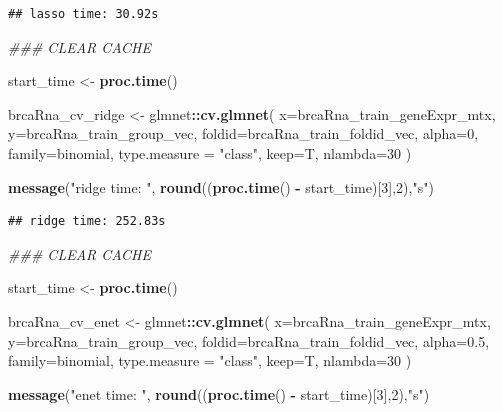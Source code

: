 \documentclass[
]{book}
\newenvironment{Shaded}{\begin{snugshade}}{\end{snugshade}}
\newcommand{\CommentTok}[1]{\textcolor[rgb]{0.56,0.35,0.01}{\textit{#1}}}
\newcommand{\DataTypeTok}[1]{\textcolor[rgb]{0.13,0.29,0.53}{#1}}
\newcommand{\DecValTok}[1]{\textcolor[rgb]{0.00,0.00,0.81}{#1}}
\newcommand{\FloatTok}[1]{\textcolor[rgb]{0.00,0.00,0.81}{#1}}
\newcommand{\KeywordTok}[1]{\textcolor[rgb]{0.13,0.29,0.53}{\textbf{#1}}}
\newcommand{\NormalTok}[1]{#1}
\newcommand{\OperatorTok}[1]{\textcolor[rgb]{0.81,0.36,0.00}{\textbf{#1}}}
\newcommand{\StringTok}[1]{\textcolor[rgb]{0.31,0.60,0.02}{#1}}
\begin{document}
\begin{verbatim}
## lasso time: 30.92s
\end{verbatim}

\begin{Shaded}
\begin{Highlighting}[]
\CommentTok{\#\#\# CLEAR CACHE}

\NormalTok{start\_time <{-}}\StringTok{  }\KeywordTok{proc.time}\NormalTok{()}

\NormalTok{brcaRna\_cv\_ridge <{-}}\StringTok{ }\NormalTok{glmnet}\OperatorTok{::}\KeywordTok{cv.glmnet}\NormalTok{(}
 \DataTypeTok{x=}\NormalTok{brcaRna\_train\_geneExpr\_mtx,}
 \DataTypeTok{y=}\NormalTok{brcaRna\_train\_group\_vec,}
 \DataTypeTok{foldid=}\NormalTok{brcaRna\_train\_foldid\_vec,}
 \DataTypeTok{alpha=}\DecValTok{0}\NormalTok{,}
 \DataTypeTok{family=}\StringTok{\textquotesingle{}binomial\textquotesingle{}}\NormalTok{, }
 \DataTypeTok{type.measure =} \StringTok{"class"}\NormalTok{,}
 \DataTypeTok{keep=}\NormalTok{T,}
 \DataTypeTok{nlambda=}\DecValTok{30}
\NormalTok{)}

\KeywordTok{message}\NormalTok{(}\StringTok{"ridge time: "}\NormalTok{, }\KeywordTok{round}\NormalTok{((}\KeywordTok{proc.time}\NormalTok{() }\OperatorTok{{-}}\StringTok{ }\NormalTok{start\_time)[}\DecValTok{3}\NormalTok{],}\DecValTok{2}\NormalTok{),}\StringTok{"s"}\NormalTok{)}
\end{Highlighting}
\end{Shaded}

\begin{verbatim}
## ridge time: 252.83s
\end{verbatim}

\begin{Shaded}
\begin{Highlighting}[]
\CommentTok{\#\#\# CLEAR CACHE}

\NormalTok{start\_time <{-}}\StringTok{  }\KeywordTok{proc.time}\NormalTok{()}

\NormalTok{brcaRna\_cv\_enet <{-}}\StringTok{ }\NormalTok{glmnet}\OperatorTok{::}\KeywordTok{cv.glmnet}\NormalTok{(}
 \DataTypeTok{x=}\NormalTok{brcaRna\_train\_geneExpr\_mtx,}
 \DataTypeTok{y=}\NormalTok{brcaRna\_train\_group\_vec,}
 \DataTypeTok{foldid=}\NormalTok{brcaRna\_train\_foldid\_vec,}
 \DataTypeTok{alpha=}\FloatTok{0.5}\NormalTok{,}
 \DataTypeTok{family=}\StringTok{\textquotesingle{}binomial\textquotesingle{}}\NormalTok{,}
 \DataTypeTok{type.measure =} \StringTok{"class"}\NormalTok{,}
 \DataTypeTok{keep=}\NormalTok{T,}
 \DataTypeTok{nlambda=}\DecValTok{30}
\NormalTok{)}

\KeywordTok{message}\NormalTok{(}\StringTok{"enet time: "}\NormalTok{, }\KeywordTok{round}\NormalTok{((}\KeywordTok{proc.time}\NormalTok{() }\OperatorTok{{-}}\StringTok{ }\NormalTok{start\_time)[}\DecValTok{3}\NormalTok{],}\DecValTok{2}\NormalTok{),}\StringTok{"s"}\NormalTok{)}
\end{Highlighting}
\end{Shaded}
\end{document}
